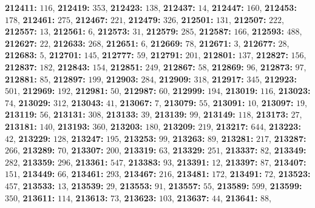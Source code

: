 \textsf{\bfseries 212411:} $116$, \textsf{\bfseries 212419:} $353$, \textsf{\bfseries 212423:} $138$, \textsf{\bfseries 212437:} $14$, \textsf{\bfseries 212447:} $160$, \textsf{\bfseries 212453:} $178$, \textsf{\bfseries 212461:} $275$, \textsf{\bfseries 212467:} $221$, \textsf{\bfseries 212479:} $326$, \textsf{\bfseries 212501:} $131$, \textsf{\bfseries 212507:} $222$, \textsf{\bfseries 212557:} $13$, \textsf{\bfseries 212561:} $6$, \textsf{\bfseries 212573:} $31$, \textsf{\bfseries 212579:} $285$, \textsf{\bfseries 212587:} $166$, \textsf{\bfseries 212593:} $488$, \textsf{\bfseries 212627:} $22$, \textsf{\bfseries 212633:} $268$, \textsf{\bfseries 212651:} $6$, \textsf{\bfseries 212669:} $78$, \textsf{\bfseries 212671:} $3$, \textsf{\bfseries 212677:} $28$, \textsf{\bfseries 212683:} $5$, \textsf{\bfseries 212701:} $145$, \textsf{\bfseries 212777:} $59$, \textsf{\bfseries 212791:} $201$, \textsf{\bfseries 212801:} $137$, \textsf{\bfseries 212827:} $156$, \textsf{\bfseries 212837:} $182$, \textsf{\bfseries 212843:} $154$, \textsf{\bfseries 212851:} $249$, \textsf{\bfseries 212867:} $58$, \textsf{\bfseries 212869:} $96$, \textsf{\bfseries 212873:} $97$, \textsf{\bfseries 212881:} $85$, \textsf{\bfseries 212897:} $199$, \textsf{\bfseries 212903:} $284$, \textsf{\bfseries 212909:} $318$, \textsf{\bfseries 212917:} $345$, \textsf{\bfseries 212923:} $501$, \textsf{\bfseries 212969:} $192$, \textsf{\bfseries 212981:} $50$, \textsf{\bfseries 212987:} $60$, \textsf{\bfseries 212999:} $194$, \textsf{\bfseries 213019:} $116$, \textsf{\bfseries 213023:} $74$, \textsf{\bfseries 213029:} $312$, \textsf{\bfseries 213043:} $41$, \textsf{\bfseries 213067:} $7$, \textsf{\bfseries 213079:} $55$, \textsf{\bfseries 213091:} $10$, \textsf{\bfseries 213097:} $19$, \textsf{\bfseries 213119:} $56$, \textsf{\bfseries 213131:} $308$, \textsf{\bfseries 213133:} $39$, \textsf{\bfseries 213139:} $99$, \textsf{\bfseries 213149:} $118$, \textsf{\bfseries 213173:} $27$, \textsf{\bfseries 213181:} $140$, \textsf{\bfseries 213193:} $360$, \textsf{\bfseries 213203:} $180$, \textsf{\bfseries 213209:} $219$, \textsf{\bfseries 213217:} $644$, \textsf{\bfseries 213223:} $42$, \textsf{\bfseries 213229:} $128$, \textsf{\bfseries 213247:} $195$, \textsf{\bfseries 213253:} $99$, \textsf{\bfseries 213263:} $89$, \textsf{\bfseries 213281:} $217$, \textsf{\bfseries 213287:} $266$, \textsf{\bfseries 213289:} $70$, \textsf{\bfseries 213307:} $200$, \textsf{\bfseries 213319:} $63$, \textsf{\bfseries 213329:} $251$, \textsf{\bfseries 213337:} $82$, \textsf{\bfseries 213349:} $282$, \textsf{\bfseries 213359:} $296$, \textsf{\bfseries 213361:} $547$, \textsf{\bfseries 213383:} $93$, \textsf{\bfseries 213391:} $12$, \textsf{\bfseries 213397:} $87$, \textsf{\bfseries 213407:} $151$, \textsf{\bfseries 213449:} $66$, \textsf{\bfseries 213461:} $293$, \textsf{\bfseries 213467:} $216$, \textsf{\bfseries 213481:} $172$, \textsf{\bfseries 213491:} $72$, \textsf{\bfseries 213523:} $457$, \textsf{\bfseries 213533:} $13$, \textsf{\bfseries 213539:} $29$, \textsf{\bfseries 213553:} $91$, \textsf{\bfseries 213557:} $55$, \textsf{\bfseries 213589:} $599$, \textsf{\bfseries 213599:} $350$, \textsf{\bfseries 213611:} $114$, \textsf{\bfseries 213613:} $73$, \textsf{\bfseries 213623:} $103$, \textsf{\bfseries 213637:} $44$, \textsf{\bfseries 213641:} $88$, 
